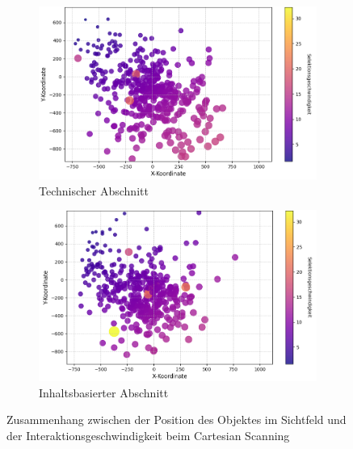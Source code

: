 \begin{figure}
    \centering
    \begin{subfigure}{.5\textwidth}
        \centering
        \includegraphics[width=1.0\textwidth]{images/Results/bubbleplot-technisch.png}
        \caption{Technischer Abschnitt}
        \label{fig:bubbleKorrPosGeschwindigkeitTechnisch}
    \end{subfigure}%
    \begin{subfigure}{.5\textwidth}
        \centering
        \includegraphics[width=1.0\textwidth]{images/Results/bubbleplot-inhalt.png}
        \caption{Inhaltsbasierter Abschnitt}
        \label{fig:bubbleKorrPosGeschwindigkeitInhalt}
    \end{subfigure}
    \caption{Zusammenhang zwischen der Position des Objektes im Sichtfeld und der Interaktionsgeschwindigkeit beim Cartesian Scanning}
    \label{fig:bubbleKorrPosGeschwindigkeit}
\end{figure}

